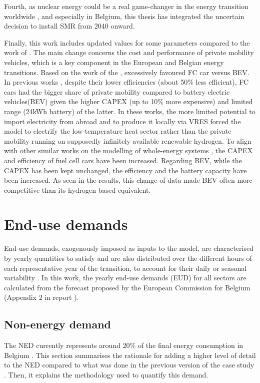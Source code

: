 Fourth, as nuclear energy could be a real game-changer in the energy transition worldwide \cite{IEA2022nuclear}, and especially in Belgium, this thesis has integrated the uncertain decision to install \gls{SMR} from 2040 onward.

Finally, this work includes updated values for some parameters compared to the work of \citet{limpens2021generating}. The main change concerns the cost and performance of private mobility vehicles, which is a key component in the European \cite{biresselioglu2018electric} and Belgian \cite{BFP_mob} energy transitions. Based on the work of the \citet{national2013transitions}, \citet{limpens2021generating} excessively favoured \gls{FC} car versus \gls{BEV}. In previous works \cite{limpens2021generating,rixhon2021role}, despite their lower efficiencies (\ie about 50\% less efficient), \gls{FC} cars had the bigger share of private mobility compared to battery electric vehicles(BEV) given the higher CAPEX (\ie up to 10\% more expensive) and limited range (\ie 24kWh battery) of the latter. In these works, the more limited potential to import electricity from abroad and to produce it locally via \gls{VRES} forced the model to electrify the low-temperature heat sector rather than the private mobility running on supposedly infinitely available renewable hydrogen. To align with other similar works on the modelling of whole-energy systems \cite{schnidrig2021modelling, EuropeanCommission2021}, the CAPEX and efficiency of fuel cell cars have been increased. Regarding \gls{BEV}, while the CAPEX has been kept unchanged, the efficiency and the battery capacity have been increased. As seen in the results, this change of data made \gls{BEV} often more competitive than its hydrogen-based equivalent. 

\section{End-use demands}
\label{sec:cs:demand}
End-use demands, exogenously imposed as inputs to the model, are characterised by yearly quantities to satisfy and are also distributed over the different hours of each representative year of the transition, to account for their daily or seasonal variability \cite{Limpens2020,limpens2021generating}. In this work, the yearly end-use demands (EUD) for all sectors are calculated from the forecast proposed by the European Commission for Belgium (Appendix 2 in report \cite{EuropeanCommission2021}). 

\subsection{Non-energy demand}
\label{subsec:cs:NED}
The \gls{NED} currently represents around 20\% of the final energy consumption in Belgium \cite{FPSEconomy2021}.  This section summarises the rationale for adding a higher level of detail to the \gls{NED} compared to what was done in the previous version of the case study \cite{limpens2021generating}. Then, it explains the methodology used to quantify this demand.\\

